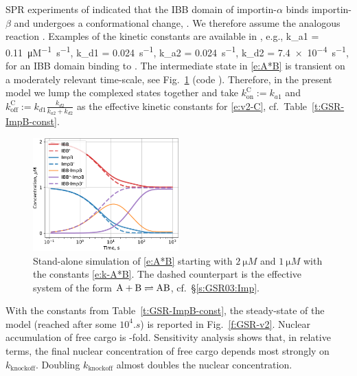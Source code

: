 \documentclass[12pt,notitlepage]{article}
\def\[#1\]{\begin{align}#1\end{align}}
\begin{document}
%

SPR experiments of \cite{Catimel2001}
indicated that
the IBB domain of importin-$\alpha$ 
binds importin-$\beta$
and undergoes a conformational change,
\[
	\label{e:A*B}
	.
\]
%
We therefore assume the analogous reaction
\[
	\label{e:Cargo*B}
	.
\]
%
%
Examples of the kinetic constants
are available in \cite[Table~I]{Catimel2001},
e.g.,
\[
	\label{e:k-A*B}
	k_{a1} = \SI{0.11}{\micro M^{-1} . s^{-1}},
	\quad
	k_{d1} = \SI{0.024}{s^{-1}},
	\qquad
	k_{a2} = \SI{0.024}{s^{-1}},
	\quad
	k_{d2} = \SI{7.4e-4}{s^{-1}},
\]
for an IBB domain binding to .
%
%
The intermediate state in \eqref{e:A*B} is transient
on a moderately relevant time-scale,
see Fig.~\ref{f:A*B}
(code \protect{}).
%
Therefore,
in the present model
we lump the complexed states together
and take
$k_\text{on}^\text{C} := k_{a1}$ and 
$k_\text{off}^\text{C} := k_{d1} \frac{k_{d2}}{k_{a2} + k_{d2}}$
as the effective kinetic constants 
for \eqref{e:v2-C}, cf.~Table~\ref{t:GSR-ImpB-const}.
%
%


\begin{figure}
\centering
\includegraphics[width=0.5\textwidth]{20210407-Rearrangement/python/timecourse}
\caption{%
	Stand-alone
	simulation of
	\eqref{e:A*B}
	starting with 
	$\SI{2}{\micro M}$ 
	and
	$\SI{1}{\micro M}$ 
	with
	the constants \eqref{e:k-A*B}.
	The dashed counterpart
	is the effective system 
	of the form
	$\ce{A} + \ce{B} \rightleftharpoons \ce{AB}$,
	cf.~\S\ref{s:GSR03:Imp}.
}
\label{f:A*B}
\end{figure}



%

With the constants from Table~\ref{t:GSR-ImpB-const},
the steady-state of the model
(reached after some $10^4 \si{. s}$)
is reported in Fig.~\ref{f:GSR-v2}.
%
Nuclear
accumulation of free cargo
is
\protect\unskip
-fold.
%
%
Sensitivity analysis shows
that, in relative terms,
the final nuclear concentration of free cargo
depends 
most strongly
on
$k_\text{knockoff}$.
%
Doubling $k_\text{knockoff}$ almost doubles 
the nuclear concentration.
\end{document}
